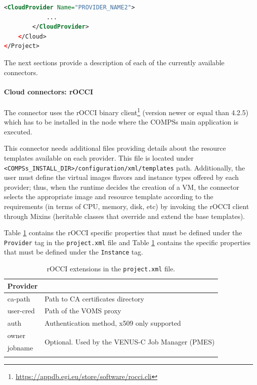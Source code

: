 \begin{lstlisting}[language=xml]
        <CloudProvider Name="PROVIDER_NAME2">
            ...
        </CloudProvider>
    </Cloud>
</Project>
\end{lstlisting}

The next sections provide a description of each of the currently available connectors.

\paragraph{Cloud connectors: rOCCI}
The connector uses the rOCCI binary client\footnote{\url{https://appdb.egi.eu/store/software/rocci.cli}} 
(version newer or equal than 4.2.5) which has to be installed in the node where the COMPSs main 
application is executed.

This connector needs additional files providing details about the resource templates available on 
each provider. This file is located under \\ \texttt{<COMPSs\_INSTALL\_DIR>/configuration/xml/templates} path. Additionally, the user must define the virtual images flavors and instance types offered by each provider; 
thus, when the runtime decides the creation of a VM, the connector selects the appropriate image and 
resource template according to the requirements (in terms of CPU, memory, disk, etc) by invoking the 
rOCCI client through Mixins (heritable classes that override and extend the base templates).

Table \ref{tab:rOCCI_extensions} contains the rOCCI specific properties that must be defined under the \texttt{Provider} tag in
the \texttt{project.xml} file and Table \ref{tab:rOCCI_extensions} contains the specific properties that must be defined
under the \texttt{Instance} tag.

\bgroup
  \def\arraystretch{1.5}
  \begin{longtable}{| p{} | p{} |}
      \hline
      \textbf{Provider}    & \\ \hline
      ca-path              & Path to CA certificates directory \\ \hline
      user-cred            & Path of the VOMS proxy \\ \hline
      auth                 & Authentication method, x509 only supported \\ \hline
      owner                & \multirow{2}{*}{Optional. Used by the VENUS-C Job Manager (PMES)} \\
                             \cline{1-1}
      jobname              & \\ \hline
      \caption{rOCCI extensions in the \texttt{project.xml} file.}
      \label{tab:rOCCI_extensions}
  \end{longtable}
\egroup

